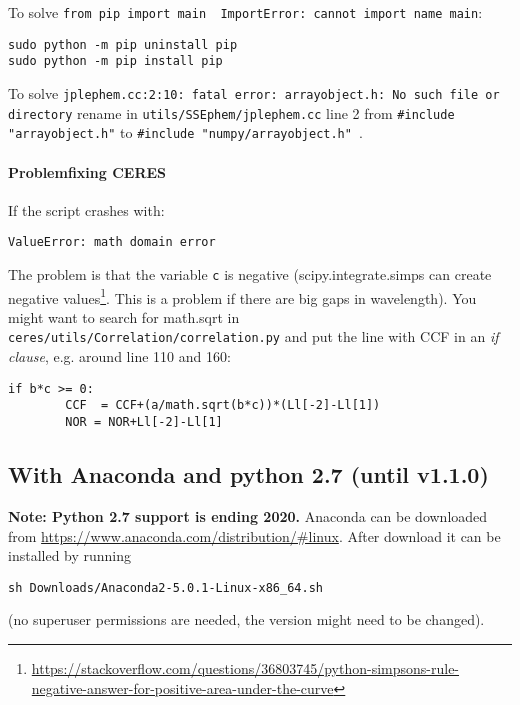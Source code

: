 \documentclass[10pt,a4paper]{article}
\begin{document}
To solve \verb|from pip import main  ImportError: cannot import name main|:
\begin{lstlisting}[style=base]
sudo python -m pip uninstall pip
sudo python -m pip install pip
\end{lstlisting}

To solve \verb|jplephem.cc:2:10: fatal error: arrayobject.h: No such file or directory| rename in \verb|utils/SSEphem/jplephem.cc| line 2 from \verb|#include "arrayobject.h"| to \verb|#include "numpy/arrayobject.h"|~.

\paragraph{Problemfixing CERES\\}

If the script crashes with:
\begin{lstlisting}[style=base]
ValueError: math domain error
\end{lstlisting}
The problem is that the variable \verb|c| is negative (scipy.integrate.simps can create negative values\footnote{\url{https://stackoverflow.com/questions/36803745/python-simpsons-rule-negative-answer-for-positive-area-under-the-curve}}. This is a problem if there are big gaps in wavelength). You might want to search for math.sqrt in\\ \verb|ceres/utils/Correlation/correlation.py| and put the line with CCF in an \textit{if clause}, e.g. around line 110 and 160:
\begin{lstlisting}[style=base]
	if b*c >= 0:
	    CCF  = CCF+(a/math.sqrt(b*c))*(Ll[-2]-Ll[1])
	    NOR = NOR+Ll[-2]-Ll[1]
\end{lstlisting}


\subsection{With Anaconda and python 2.7 (until v1.1.0)}
\textbf{Note: Python 2.7 support is ending 2020.}
\noindent Anaconda can be downloaded from \url{https://www.anaconda.com/distribution/#linux}. After download it can be installed by running
\begin{lstlisting}[style=base]
sh Downloads/Anaconda2-5.0.1-Linux-x86_64.sh
\end{lstlisting}
(no superuser permissions are needed, the version might need to be changed).
\end{document}
